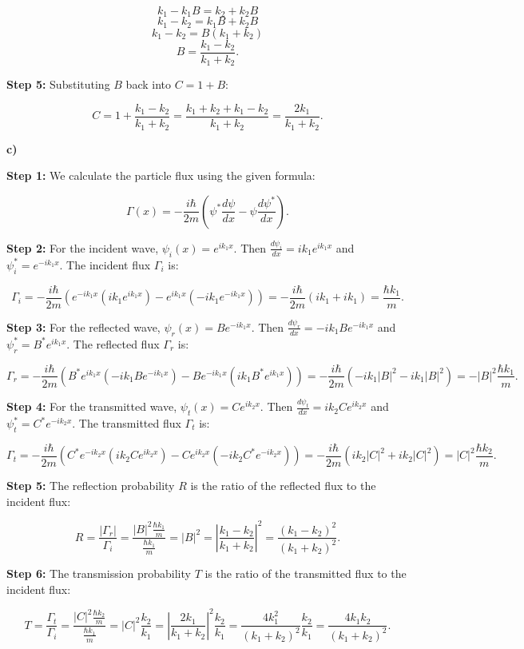 \documentclass{article}
\begin{document}
\[ k_1 - k_1B = k_2 + k_2B \]
\[ k_1 - k_2 = k_1B + k_2B \]
\[ k_1 - k_2 = B(k_1 + k_2) \]
\[ B = \frac{k_1 - k_2}{k_1 + k_2}. \]

\textbf{Step 5:} Substituting $B$ back into $C = 1 + B$:

\[ C = 1 + \frac{k_1 - k_2}{k_1 + k_2} = \frac{k_1 + k_2 + k_1 - k_2}{k_1 + k_2} = \frac{2k_1}{k_1 + k_2}. \]

\textbf{c)}

\textbf{Step 1:} We calculate the particle flux using the given formula:

\[ \Gamma(x) = -\frac{i\hbar}{2m} \left( \psi^* \frac{d\psi}{dx} - \psi \frac{d\psi^*}{dx} \right). \]

\textbf{Step 2:} For the incident wave, $\psi_i(x) = e^{ik_1x}$. Then $\frac{d\psi_i}{dx} = ik_1e^{ik_1x}$ and $\psi_i^* = e^{-ik_1x}$. The incident flux $\Gamma_i$ is:

\[ \Gamma_i = -\frac{i\hbar}{2m} \left( e^{-ik_1x}(ik_1e^{ik_1x}) - e^{ik_1x}(-ik_1e^{-ik_1x}) \right) = -\frac{i\hbar}{2m}(ik_1 + ik_1) = \frac{\hbar k_1}{m}. \]

\textbf{Step 3:} For the reflected wave, $\psi_r(x) = Be^{-ik_1x}$. Then $\frac{d\psi_r}{dx} = -ik_1Be^{-ik_1x}$ and $\psi_r^* = B^*e^{ik_1x}$. The reflected flux $\Gamma_r$ is:

\[ \Gamma_r = -\frac{i\hbar}{2m} \left( B^*e^{ik_1x}(-ik_1Be^{-ik_1x}) - Be^{-ik_1x}(ik_1B^*e^{ik_1x}) \right) = -\frac{i\hbar}{2m}(-ik_1|B|^2 - ik_1|B|^2) = -|B|^2\frac{\hbar k_1}{m}. \]

\textbf{Step 4:} For the transmitted wave, $\psi_t(x) = Ce^{ik_2x}$. Then $\frac{d\psi_t}{dx} = ik_2Ce^{ik_2x}$ and $\psi_t^* = C^*e^{-ik_2x}$. The transmitted flux $\Gamma_t$ is:

\[ \Gamma_t = -\frac{i\hbar}{2m} \left( C^*e^{-ik_2x}(ik_2Ce^{ik_2x}) - Ce^{ik_2x}(-ik_2C^*e^{-ik_2x}) \right) = -\frac{i\hbar}{2m}(ik_2|C|^2 + ik_2|C|^2) = |C|^2\frac{\hbar k_2}{m}. \]

\textbf{Step 5:} The reflection probability $R$ is the ratio of the reflected flux to the incident flux:

\[ R = \frac{|\Gamma_r|}{\Gamma_i} = \frac{|B|^2 \frac{\hbar k_1}{m}}{\frac{\hbar k_1}{m}} = |B|^2 = \left|\frac{k_1 - k_2}{k_1 + k_2}\right|^2 = \frac{(k_1 - k_2)^2}{(k_1 + k_2)^2}. \]

\textbf{Step 6:} The transmission probability $T$ is the ratio of the transmitted flux to the incident flux:

\[ T = \frac{\Gamma_t}{\Gamma_i} = \frac{|C|^2 \frac{\hbar k_2}{m}}{\frac{\hbar k_1}{m}} = |C|^2 \frac{k_2}{k_1} = \left|\frac{2k_1}{k_1 + k_2}\right|^2 \frac{k_2}{k_1} = \frac{4k_1^2}{(k_1 + k_2)^2} \frac{k_2}{k_1} = \frac{4k_1k_2}{(k_1 + k_2)^2}. \]
\end{document}

